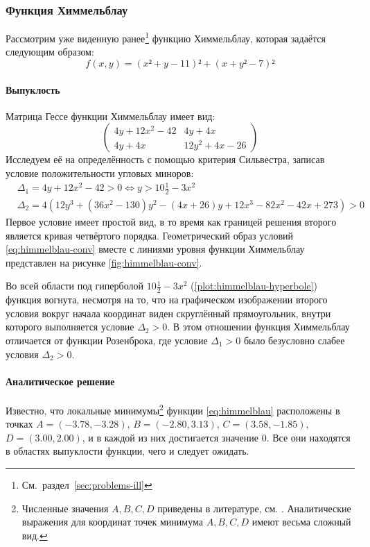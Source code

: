 \subsubsection{Функция Химмельблау}
\label{sec:himmelblau}

Рассмотрим уже виденную
ранее\footnote{См. раздел \ref{sec:problems-ill}} функцию Химмельблау,
которая задаётся следующим образом:
\begin{equation}
  \label{eq:himmelblau}
  \tag{$\chi$-\theequation}
  f(x, y) = (x² + y - 11)² + (x + y² - 7)²
\end{equation}

\paragraph{Выпуклость}

Матрица Гессе функции Химмельблау имеет вид:
\begin{equation}
  \label{eq:himmelblau-hess}
  \begin{pmatrix}
    4y+12x^2-42 & 4y+4x\\
    4y+4x & 12y^2+4x-26
  \end{pmatrix}
\end{equation}
Исследуем её на определённость с помощью критерия Сильвестра, записав
условие положительности угловых миноров:
\begin{align}
  \label{eq:himmelblau-conv}
  &\Delta_1 = 4y+12x^2-42 > 0 \iff y > 10\frac{1}{2}-3x^2 \\
  &\Delta_2 =
  4\left(12y^3+(36x^2-130)y^2-(4x+26)y+12x^3-82x^2-42x+273\right) > 0
\end{align}
Первое условие имеет простой вид, в то время как границей решения
второго является кривая четвёртого порядка. Геометрический образ
условий \eqref{eq:himmelblau-conv} вместе с линиями уровня функции
Химмельблау представлен на рисунке \ref{fig:himmelblau-conv}. 



Во всей области под гиперболой $10\frac{1}{2}-3x^2$
(\ref{plot:himmelblau-hyperbole}) функция вогнута, несмотря на то, что
на графическом изображении второго условия вокруг начала координат
виден скруглённый прямоугольник, внутри которого выполняется условие
$\Delta_2>0$. В этом отношении функция Химмельблау отличается от
функции Розенброка, где условие $\Delta_1>0$ было безусловно слабее
условия $\Delta_2>0$.

\paragraph{Аналитическое решение}
Известно, что локальные минимумы\footnote{Численные значения $A, B, C,
  D$ приведены в литературе, см. \cite{himmelblau75}. Аналитические
  выражения для координат точек минимума $A,B,C,D$ имеют весьма
  сложный вид.} функции \eqref{eq:himmelblau} расположены в точках
$A=(-3.78, -3.28)$, $B=(-2.80, 3.13)$, $C=(3.58, -1.85)$,
\mbox{$D=(3.00, 2.00)$}, и в каждой из них достигается значение $0$.
Все они находятся в областях выпуклости функции, чего и следует
ожидать.

